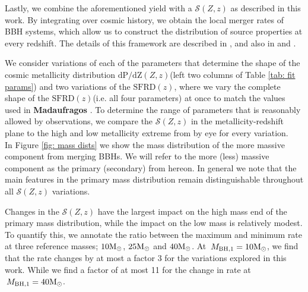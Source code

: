 \documentclass[twocolumn]{aastex631}
\newcommand{\Msun}{\ensuremath{\rm{M}_{\odot}}\xspace}
\newcommand{\Mbheen}{\ensuremath{\,M_{\rm BH, 1}}\xspace}
\newcommand{\SFRDzZ}{\ensuremath{\mathcal{S}(Z,z)}\xspace}
\newcommand{\SFRDz}{\ensuremath{\mathrm{SFRD}(z)}\xspace}
\newcommand{\dpdZ}{\ensuremath{\mathrm{dP/dZ}(Z,z)}\xspace}
\newcommand{\todo}[1]{{\color{purple}\bf{#1}}}
\begin{document}
Lastly, we combine the aforementioned yield with a \SFRDzZ as described in this work. By integrating over cosmic history, we obtain the local merger rates of BBH systems, which allow us to construct the distribution of source properties at every redshift. The details of this framework are described in \cite{vanson+2022}, and also in \cite{Broekgaarden+2021a} and \cite{Neijssel+2019}. 

We consider variations of each of the parameters that determine the shape of the cosmic metallicity distribution \dpdZ (left two columns of Table \ref{tab: fit params}) and two variations of the \SFRDz, where we vary the complete shape of the \SFRDz (i.e. all four parameters) at once to match the values used in \todo{Madaufragos} \cite{Neijssel2019}. To determine the range of parameters that is reasonably allowed by observations, we compare the \SFRDzZ in the metallicity-redshift plane to the high and low metallicity extreme from \cite{Chruslinska+2021} by eye for every variation. \\


In Figure \ref{fig: mass dists} we show the mass distribution of the more massive component from merging BBHs. We will refer to the more (less) massive component as the primary (secondary) from hereon. 
In general we note that the main features in the primary mass distribution remain distinguishable throughout all \SFRDzZ variations. 


Changes in the \SFRDzZ have the largest impact on the high mass end of the primary mass distribution, while the impact on the low mass is relatively modest.
To quantify this, we annotate the ratio between the maximum and minimum rate at three reference masses; $10\Msun$, $25\Msun$ and $40\Msun$. 
At $\Mbheen=10\Msun$, we find that the rate changes by at most a factor 3 for the variations explored in this work. While we find a factor of at most 11 for the change in rate at $\Mbheen=40\Msun$. 
\end{document}
